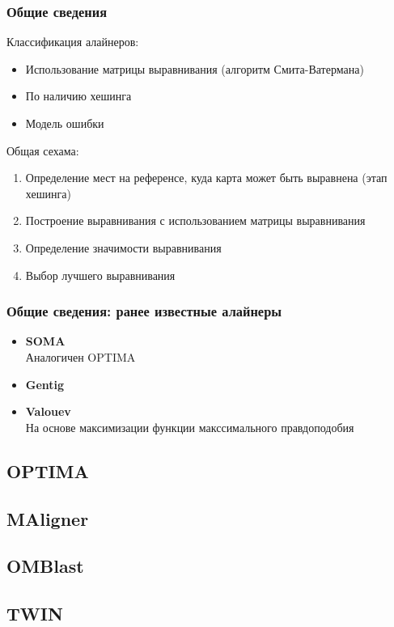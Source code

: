 \documentclass{beamer}
\begin{document}
\begin{frame}
\frametitle{Общие сведения}
Классификация алайнеров:
\begin{itemize}
  \item Использование матрицы выравнивания (алгоритм Смита-Ватермана)
  \item По наличию хешинга
  \item Модель ошибки
\end{itemize}
Общая сехама:
\begin{enumerate}
  \item Определение мест на референсе, куда карта может быть выравнена (этап хешинга)
  \item Построение выравнивания с использованием матрицы выравнивания
  \item Определение значимости выравнивания
  \item Выбор лучшего выравнивания
\end{enumerate}
\end{frame}

\begin{frame}
\frametitle{Общие сведения: ранее известные алайнеры}
\begin{itemize}
  \item \textbf{SOMA\nocite{SOMA}} \\
  Аналогичен OPTIMA
  \item \textbf{Gentig} \\
  \item \textbf{Valouev} \\
  На основе максимизации функции макссимального правдоподобия
\end{itemize}
\end{frame}

\subsection{OPTIMA}


\subsection{MAligner}


\subsection{OMBlast}


\subsection{TWIN}

\end{document}
